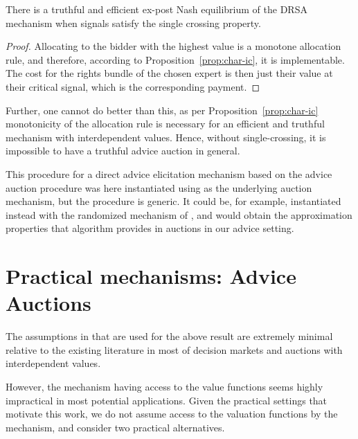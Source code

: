 
\begin{thm}
	There is a truthful and efficient ex-post Nash equilibrium of the DRSA mechanism when signals satisfy the single crossing property.
\end{thm}

\begin{proof}
Allocating to the bidder with the highest value is a monotone allocation rule, and therefore, according to Proposition~\ref{prop:char-ic}, it is implementable. The cost for the rights bundle of the chosen expert is then just their value at their critical signal, which is the corresponding payment.
\end{proof}

Further, one cannot do better than this, as per Proposition~\ref{prop:char-ic} monotonicity of the allocation rule is necessary for an efficient and truthful mechanism with interdependent values. Hence, without single-crossing, it is impossible to have a truthful advice auction in general.

This procedure for a direct advice elicitation mechanism based on the advice auction procedure was here instantiated using \citep{maskin1992auctions}  as the underlying auction mechanism, but the procedure is generic. It could be, for example, instantiated instead with the randomized mechanism of \citep{eden2018interdependent}, and would obtain the approximation properties that algorithm provides in auctions in our advice setting.


\section{Practical mechanisms: Advice Auctions}

The assumptions in \citep{roughgarden2016optimal} that are used for the above result are extremely minimal relative to the existing literature in most of decision markets and auctions with interdependent values.

However, the mechanism having access to the value functions seems highly impractical in most potential applications.
Given the practical settings that motivate this work, 
we do not assume access to the valuation functions by the mechanism, and consider two practical alternatives.


